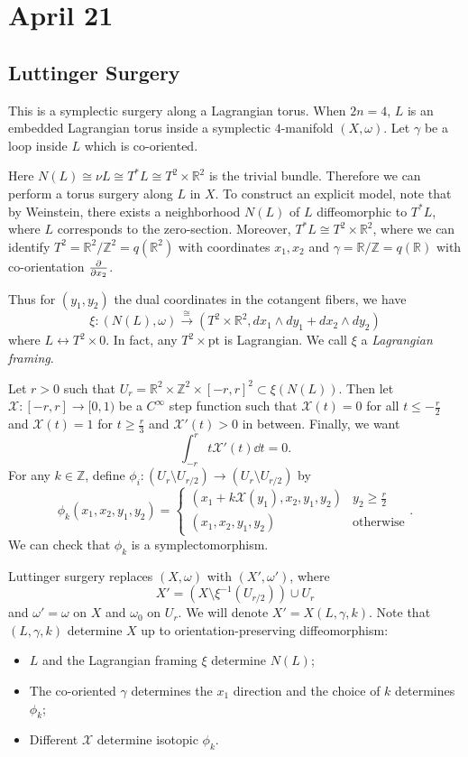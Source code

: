 \documentclass[leqno, openany]{memoir}
\theoremstyle{definition}
\theoremstyle{remark}
\theoremstyle{plain}
\theoremstyle{definition}
\theoremstyle{remark}
\newcommand{\R}{\mathbb{R}}
\newcommand{\Z}{\mathbb{Z}}
\newcommand{\mc}[1]{\mathcal{#1}}
\newcommand{\mr}[1]{\mathrm{#1}}
\begin{document}
    \chapter{April 21}%
    \label{cha:april_21}
    
    \section{Luttinger Surgery}%
    \label{sec:luttinger_surgery}
    
    This is a symplectic surgery along a Lagrangian torus. When $2n = 4$, $L$ is an embedded Lagrangian torus inside a symplectic $4$-manifold $(X, \omega)$. Let $\gamma$ be a loop inside $L$ which is co-oriented.

    Here $N(L) \cong \nu L \cong T^*L \cong T^2 \times \R^2$ is the trivial bundle. Therefore we can perform a torus surgery along $L$ in $X$. To construct an explicit model, note that by Weinstein, there exists a neighborhood $N(L)$ of $L$ diffeomorphic to $T^*L$, where $L$ corresponds to the zero-section. Moreover, $T^*L \cong T^2 \times \R^2$, where we can identify $T^2 = \R^2/\Z^2 = q(\R^2)$ with coordinates $x_1, x_2$ and $\gamma = \R/\Z = q(\R)$ with co-orientation $\pdv{x_2}$.

    Thus for $(y_1, y_2)$ the dual coordinates in the cotangent fibers, we have
    \[ \xi: (N(L), \omega) \xrightarrow{\cong} (T^2 \times \R^2, dx_1
    \wedge dy_1 + dx_2 \wedge dy_2) \] where $L \longleftrightarrow T^2
    \times 0$. In fact, any $T^2 \times \mr{pt}$ is Lagrangian. We call
    $\xi$ a \textit{Lagrangian framing}.

    Let $r > 0$ such that $U_r = \R^2 \times \Z^2 \times [-r,r]^2 \subset \xi(N(L))$. Then let $\mc{X}: [-r,r] \to [0,1)$ be a $C^{\infty}$ step function such that $\mc{X}(t) = 0$ for all $t \leq -\frac{r}{2}$ and $\mc{X}(t) = 1$ for $t \geq \frac{r}{3}$ and $\mc{X}'(t) > 0$ in between. Finally, we want
    \[ \int_{-r}^r t \mc{X}'(t) \dd{t} = 0. \]
    For any $k \in \Z$, define $\phi_i: (U_r \setminus U_{r/2}) \to (U_r \setminus U_{r/2})$ by
    \[ \phi_k(x_1,x_2,y_1,y_2) = \begin{cases}
        (x_1 + k \mc{X}(y_1), x_2, y_1, y_2) & y_2 \geq \frac{r}{2} \\
        (x_1,x_2,y_1,y_2) & \text{otherwise}
    \end{cases}. \]
    We can check that $\phi_k$ is a symplectomorphism.

    Luttinger surgery replaces $(X, \omega)$ with $(X',\omega')$, where
    \[ X' = (X \setminus \xi^{-1}(U_{r/2})) \cup U_r \]
    and $\omega' = \omega$ on $X$ and $\omega_0$ on $U_r$. We will denote $X' = X(L, \gamma, k)$. Note that $(L, \gamma, k)$ determine $X$ up to orientation-preserving diffeomorphism:
    \begin{itemize}
        \item $L$ and the Lagrangian framing $\xi$ determine $N(L)$;
        \item The co-oriented $\gamma$ determines the $x_1$ direction and the choice of $k$ determines $\phi_k$;
        \item Different $\mc{X}$ determine isotopic $\phi_k$.
    \end{itemize}
\end{document}
